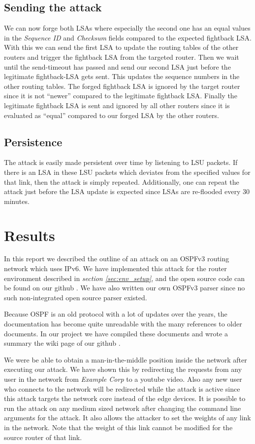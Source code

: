 \documentclass[11pt,a4paper,oneside]{article}
\newcommand{\lsection}[2]{\section{#1}\label{sec:#2}}
\newcommand{\lsubsection}[2]{\subsection{#1}\label{sec:#2}}
\begin{document}
    \lsubsection{Sending the attack}{send_attack}
    We can now forge both LSAs where especially the second one has an equal values in the \textit{Sequence ID} and \textit{Checksum} fields compared to the expected fightback LSA.
    With this we can send the first LSA to update the routing tables of the other routers and trigger the fightback LSA from the targeted router.
    Then we wait until the send-timeout has passed and send our second LSA just before the legitimate fightback-LSA gets sent.
    This updates the sequence numbers in the other routing tables.
    The forged fightback LSA is ignored by the target router since it is not ``newer'' compared to the legitimate fightback LSA.
    Finally the legitimate fightback LSA is sent and ignored by all other routers since it is evaluated as ``equal'' compared to our forged LSA by the other routers.

    \lsubsection{Persistence}{persistence}
    The attack is easily made persistent over time by listening to LSU packets.
    If there is an LSA in these LSU packets which deviates from the specified values for that link, then the attack is simply repeated.
    Additionally, one can repeat the attack just before the LSA update is expected since LSAs are re-flooded every 30 minutes.


    \lsection{Results}{results}
    In this report we described the outline of an attack on an OSPFv3 routing network which uses IPv6.
    We have implemented this attack for the router environment described in \textit{section \ref{sec:env_setup}}, and the open source code can be found on our github \cite{wiki}.
    We have also written our own OSPFv3 parser since no such non-integrated open source parser existed.

    Because OSPF is an old protocol with a lot of updates over the years, the documentation has become quite unreadable with the many references to older documents.
    In our project we have compiled these documents and wrote a summary the wiki page of our github \cite{wiki}.

    We were be able to obtain a man-in-the-middle position inside the network after executing our attack.
    We have shown this by redirecting the requests from any user in the network from \textit{Example Corp} to a youtube video.
    Also any new user who connects to the network will be redirected while the attack is active since this attack targets the network core instead of the edge devices.
    It is possible to run the attack on any medium sized network after changing the command line arguments for the attack.
    It also allows the attacker to set the weights of any link in the network.
    Note that the weight of this link cannot be modified for the source router of that link.
\end{document}
